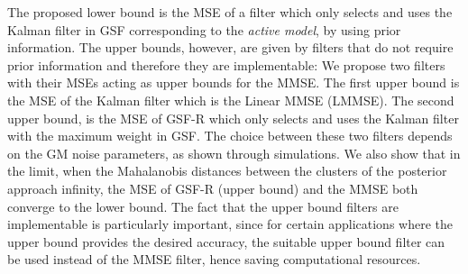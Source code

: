 \documentclass[10pt,twocolumn,twoside]{IEEEtran}
\newcommand{\corcol}[1]{\textcolor{CorCol}{#1}}
\begin{document}
The proposed lower bound is the MSE of a filter which only selects and uses the Kalman filter in GSF corresponding to the \textit{active model}, by using prior information. The upper bounds, however, are given by filters that do not require prior information and therefore they are implementable: We propose two filters with their MSEs acting as upper bounds for the MMSE. The first upper bound is the MSE of \corcol{the }Kalman filter which is the Linear MMSE (LMMSE). The second upper bound, is the MSE of GSF-R which only selects and uses the Kalman filter with the maximum weight in GSF. The choice between these two filters depends on the GM noise parameters, as shown through simulations. We also show that in the limit, when the Mahalanobis distances between the clusters of the posterior approach infinity, the MSE of GSF-R (upper bound) and the MMSE both converge to the lower bound. The fact that the upper bound filters are implementable is particularly important, since for  certain applications where the upper bound provides the desired accuracy, the suitable upper bound filter can be used instead of the MMSE filter, hence saving computational resources. 


















\appendices
\end{document}
